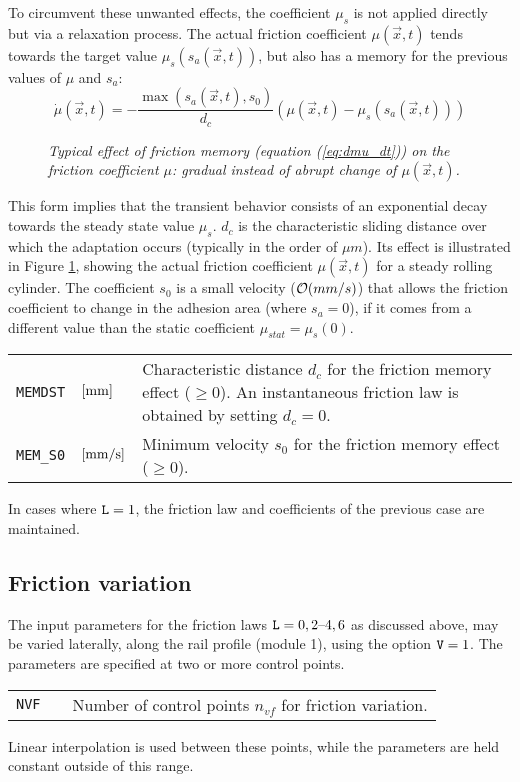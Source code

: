 \documentclass[12pt]{report}
\renewcommand{\magenta}[1]{}
\newenvironment{inputvars}{\vspace{0.4\baselineskip}%

\begin{tabular}{>{\raggedright}p{22mm}p{19mm}p{113mm}}}{
\end{tabular}

}
\newcommand{\inpvar}[3]{{\small\tt #1} & $#2$ & #3 \\[1ex]}
\begin{document}
To circumvent these unwanted effects, the coefficient $\mu_s$ is
not applied directly but via a relaxation process. The actual friction
coefficient $\mu(\vec{x},t)$ tends towards the target value
$\mu_s(s_a(\vec{x},t))$, but also has a memory for the previous values of
$\mu$ and $s_a$:
\begin{equation}
  \dot{\mu}(\vec{x},t) = -\frac{\max(s_a(\vec{x},t),s_0)}{d_c}
            \left( \mu(\vec{x},t) - \mu_s(s_a(\vec{x},t)) \right)
                \label{eq:dmu_dt}
\end{equation}

\begin{figure}[bt]
\centering
{}
\caption{\em Typical effect of friction memory (equation (\ref{eq:dmu_dt}))
on the friction coefficient $\mu$: gradual instead of abrupt change of
$\mu(\vec{x},t)$.}
\label{fig:fric_mem}
\end{figure}

This form implies that the transient behavior consists of an exponential
decay towards the steady state value $\mu_s$. $d_c$ is the characteristic
sliding distance over which the adaptation occurs (typically in the order
of $\mu m$). Its effect is illustrated in Figure \ref{fig:fric_mem}, showing
the actual friction coefficient $\mu(\vec{x},t)$ for a steady rolling
cylinder. The coefficient $s_0$ is a small velocity (${\cal O}(mm/s)$) that
allows the friction coefficient to change in the adhesion area (where
$s_a=0$), if it comes from a different value than the static coefficient
$\mu_{stat}=\mu_s(0)$.
\begin{inputvars}
\inpvar{MEMDST}{\bunit{mm}}{Characteristic distance $d_c$ for the friction memory
        effect ($\ge 0$). An instantaneous friction law is obtained by
        setting $d_c=0$.}
\inpvar{MEM\_S0}{\bunit{mm/s}}{Minimum velocity $s_0$ for the friction memory
        effect ($\ge 0$).}
\end{inputvars}

In cases where ${\tt L}=1$, the friction law and coefficients of the previous
case are maintained.

\subsection{Friction variation}
\label{sec:varfrc}

The input parameters for the friction laws ${\tt L}=0, 2\text{--}4, 6$ as
discussed above, may be varied laterally, along the rail profile (module
1)\magenta{\ or contact $y$-direction (module 3)}, using the option 
${\tt V}=1$. The parameters are specified at two or more control points. 
\begin{inputvars}
\inpvar{NVF}{ }{Number of control points $n_{vf}$ for friction variation.}
\end{inputvars}
Linear interpolation is used between these points, while the parameters
are held constant outside of this range.
\end{document}

